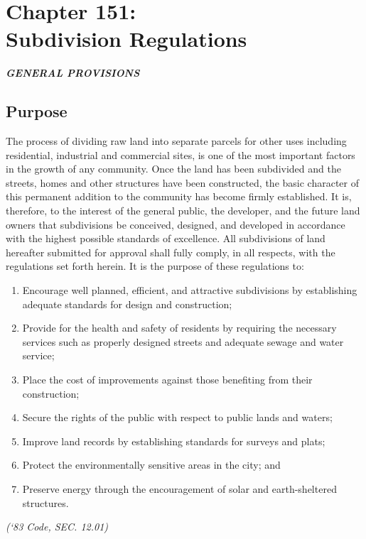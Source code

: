 \chapter*{Chapter 151: \\
	Subdivision Regulations}
    \minitoc
    \pagebreak

\begin{center}
    \emph{\textbf{\LARGE{GENERAL PROVISIONS}}}
\end{center}

\section{Purpose}
The process of dividing raw land into separate parcels for other uses including residential, industrial and commercial sites, is one of the most important factors in the growth of any community. Once the land has been subdivided and the streets, homes and other structures have been constructed, the basic character of this permanent addition to the community has become firmly established. It is, therefore, to the interest of the general public, the developer, and the future land owners that subdivisions be conceived, designed, and developed in accordance with the highest possible standards of excellence. All subdivisions of land hereafter submitted for approval shall fully comply, in all respects, with the regulations set forth herein. It is the purpose of these regulations to:
\begin{enumerate}[{\indent}A)]
    \item Encourage well planned, efficient, and attractive subdivisions by establishing adequate standards for design and construction; 
    \item Provide for the health and safety of residents by requiring the necessary services such as properly designed streets and adequate sewage and water service; 
    \item Place the cost of improvements against those benefiting from their construction; 
    \item Secure the rights of the public with respect to public lands and waters; 
    \item Improve land records by establishing standards for surveys and plats; 
    \item Protect the environmentally sensitive areas in the city; and 
    \item Preserve energy through the encouragement of solar and earth-sheltered structures.
\end{enumerate}
\emph{(‘83 Code, SEC. 12.01)}
